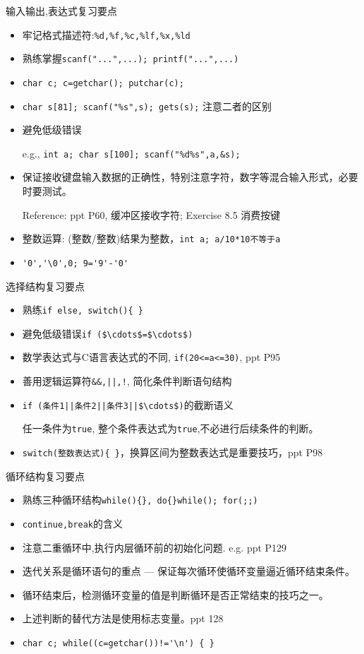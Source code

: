 
\begin{frame}[fragile]{输入输出,表达式复习要点}
\begin{itemize}
	\item 牢记格式描述符:\lstinline|%d,%f,%c,%lf,%x,%ld|
	\item 熟练掌握\lstinline|scanf("...",...); printf("...",...)|
	\item \lstinline|char c; c=getchar(); putchar(c);|
	\item \lstinline|char s[81]; scanf("%s",s); gets(s);| 注意二者的区别
	\item 避免低级错误
	
	e.g., \lstinline|int a; char s[100]; scanf("%d%s",a,&s);|
	
	\item 保证接收键盘输入数据的正确性，特别注意字符，数字等混合输入形式，必要时要测试。
	
	Reference: ppt P60, 缓冲区接收字符;  Exercise 8.5 消费按键
	
	\item 整数运算: (整数/整数)结果为整数，\lstinline|int a; a/10*10不等于a|
	\item \lstinline|'0','\0',0; 9='9'-'0'|
\end{itemize}
\end{frame}

\begin{frame}[fragile]{选择结构复习要点}
\begin{itemize}
	\item 熟练\lstinline|if else, switch(){ }|
	\item 避免低级错误\lstinline|if ($\cdots$=$\cdots$)|
	\item 数学表达式与C语言表达式的不同, \lstinline|if(20<=a<=30)|, ppt P95
	\item 善用逻辑运算符\lstinline$&&,||,!$, 简化条件判断语句结构
	\item \lstinline!if (条件1||条件2||条件3||$\cdots$)!的截断语义
	
	任一条件为\lstinline|true|, 整个条件表达式为\lstinline|true|,不必进行后续条件的判断。
	\item \lstinline|switch(整数表达式){ }|，换算区间为整数表达式是重要技巧，ppt P98
\end{itemize}
\end{frame}

\begin{frame}[fragile]{循环结构复习要点}
\begin{itemize}
	\item 熟练三种循环结构\lstinline|while(){}, do{}while(); for(;;)|
	\item \lstinline|continue,break|的含义
	\item 注意二重循环中,执行内层循环前的初始化问题. e.g. ppt P129
	\item 迭代关系是循环语句的重点 --- 保证每次循环使循环变量逼近循环结束条件。
	\item 循环结束后，检测循环变量的值是判断循环是否正常结束的技巧之一。
	\item 上述判断的替代方法是使用标志变量。ppt 128
	\item \lstinline|char c; while((c=getchar())!='\n') { }|
\end{itemize}
\end{frame}

